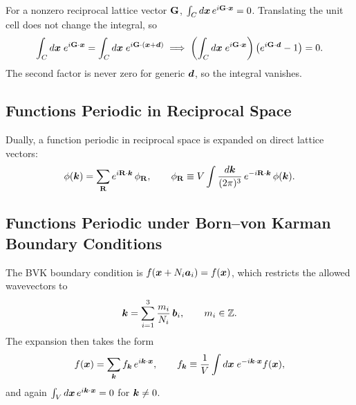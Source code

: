 \begin{theorem}
For a nonzero reciprocal lattice vector $\cvect{G}$, $\int_C d\lvect{x}\, e^{i\cvect{G}\cdot\lvect{x}} = 0$. Translating the unit cell does not change the integral, so
\begin{equation}
    \int_C d\lvect{x}\; e^{i\cvect{G}\cdot\lvect{x}} = \int_C d\lvect{x}\; e^{i\cvect{G}\cdot(\lvect{x}+\lvect{d})}
    \;\Longrightarrow\;
    \left(\int_C d\lvect{x}\; e^{i\cvect{G}\cdot\lvect{x}}\right)\bigl(e^{i\cvect{G}\cdot\lvect{d}} - 1\bigr) = 0.
\end{equation}
The second factor is never zero for generic $\bm{d}$, so the integral vanishes.
\end{theorem}

\subsection{Functions Periodic in Reciprocal Space}

Dually, a function periodic in reciprocal space is expanded on direct lattice vectors:
\begin{equation}
    \phi(\lvect{k}) = \sum_{\cvect{R}} e^{i\cvect{R}\cdot\lvect{k}}\, \phi_{\cvect{R}},
    \qquad
    \phi_{\cvect{R}} \equiv V \int \frac{d\lvect{k}}{(2\pi)^3}\, e^{-i\cvect{R}\cdot\lvect{k}}\, \phi(\lvect{k}).
\end{equation}

\subsection{Functions Periodic under Born--von Karman Boundary Conditions}

The BVK boundary condition is $f(\bm{x} + N_i \bm{a}_i) = f(\bm{x})$, which restricts the allowed wavevectors to
\begin{equation}
    \bm{k} = \sum_{i=1}^{3} \frac{m_i}{N_i}\, \bm{b}_i, \qquad m_i \in \mathbb{Z}.
\end{equation}
The expansion then takes the form
\begin{equation}
    f(\bm{x}) = \sum_{\bm{k}} f_{\bm{k}}\, e^{i\bm{k}\cdot\bm{x}},
    \qquad
    f_{\bm{k}} \equiv \frac{1}{V}\int d\bm{x}\; e^{-i\bm{k}\cdot\bm{x}} f(\bm{x}),
\end{equation}
and again $\int_V d\bm{x}\, e^{i\bm{k}\cdot\bm{x}} = 0$ for $\bm{k} \neq 0$.

